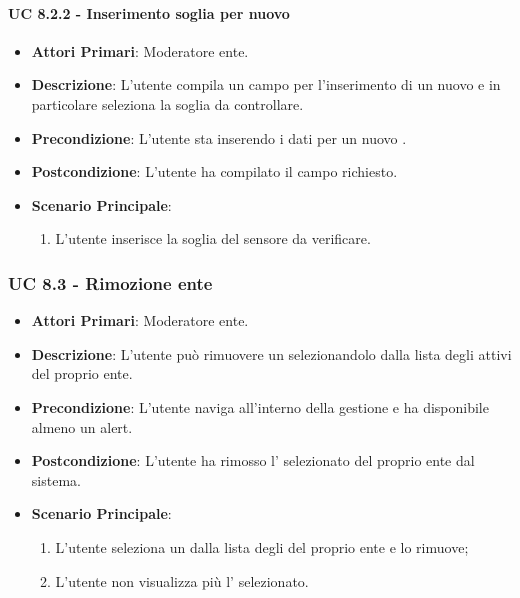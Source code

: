 				\paragraph{UC 8.2.2 - Inserimento soglia per nuovo }
				\begin{itemize}
					\item \textbf{Attori Primari}: Moderatore ente.
					\item \textbf{Descrizione}: L'utente compila un campo per l'inserimento di un nuovo  e in particolare seleziona la soglia da controllare.
					\item \textbf{Precondizione}: L'utente sta inserendo i dati per un nuovo .
					\item \textbf{Postcondizione}: L'utente ha compilato il campo richiesto.
					\item \textbf{Scenario Principale}:
					\begin{enumerate}
						\item{L'utente inserisce la soglia del sensore da verificare.}
					\end{enumerate}	
				\end{itemize}

			\subsubsection{UC 8.3 - Rimozione  ente}
			\begin{itemize}
				\item \textbf{Attori Primari}: Moderatore ente.
				\item \textbf{Descrizione}: L'utente può rimuovere un  selezionandolo dalla lista degli  attivi del proprio ente.
				\item \textbf{Precondizione}: L'utente naviga all'interno della gestione  e ha disponibile almeno un alert.
				\item \textbf{Postcondizione}: L'utente ha rimosso l' selezionato del proprio ente dal sistema.
				\item \textbf{Scenario Principale}:
				\begin{enumerate}
					\item{L'utente seleziona un  dalla lista degli  del proprio ente e lo rimuove;}
					\item{L'utente non visualizza più l' selezionato.}
				\end{enumerate}	
			\end{itemize}

